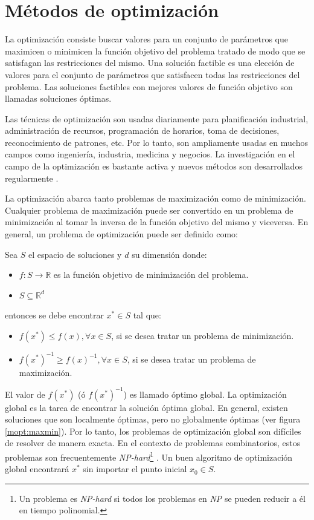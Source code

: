 \chapter{Métodos de optimización} 
\label{chap:mopt}

    La optimización consiste buscar valores para un conjunto de parámetros que
ma\-xi\-mi\-cen o minimicen la función objetivo del problema tratado de modo que
se satisfagan las restricciones del mismo. Una solución factible es una
elección de valores para el conjunto de parámetros que satisfacen todas las
restricciones del problema. Las soluciones factibles con mejores valores de
función objetivo son llamadas soluciones óptimas.

Las técnicas de optimización son usadas diariamente para planificación
industrial, administración de recursos, programación de horarios, toma de
decisiones, reconocimiento de patrones, etc\cite{GO_1}. Por lo tanto, son
ampliamente usadas en muchos campos como ingeniería, industria, medicina y
negocios. La investigación en el campo de la optimización es bastante
activa y nuevos métodos son desarrollados regularmente \cite{GO_1}.

La optimización abarca tanto problemas de maximización como de minimización.
Cualquier pro\-ble\-ma de maximización puede ser convertido en un problema de
minimización al tomar la inversa de la función objetivo del mismo y
viceversa. En general, un problema de optimización puede ser definido como:

    Sea $S$ el espacio de soluciones y $d$ su dimensión donde:
\begin{itemize}
    \item $f: S \rightarrow \mathbb{R}$ es la función objetivo de minimización del problema.
    \item $S \subseteq \mathbb{R}^d$
\end{itemize}
    entonces se debe encontrar $x^* \in S$ tal que:
\begin{itemize}
    \item $f(x^*) \leq f(x), \forall x \in S$, si se desea tratar un problema de minimización.
    \item $f(x^*)^{-1} \geq f(x)^{-1}, \forall x \in S$, si se desea tratar un problema de maximización.
\end{itemize}

El valor de $f(x^*)$ (ó $f(x^*)^{-1}$) es llamado óptimo global. La
optimización global es la tarea de encontrar la solución óptima global. En
general, existen soluciones que son localmente óptimas, pero no globalmente
óptimas (ver figura \ref{mopt:maxmin}). Por lo tanto, los problemas de optimización
global son difíciles de resolver de manera exacta. En el contexto de problemas
combinatorios, estos problemas son frecuentemente \emph{NP-hard}\footnote{Un
problema es \emph{NP-hard} si todos los problemas en \emph{NP} se pueden reducir
a él en tiempo polinomial.\cite{NPHARD}} \cite{GO_2}. Un buen algoritmo de
optimización global encontrará $x^*$ sin importar el punto inicial $x_0 \in S$.

